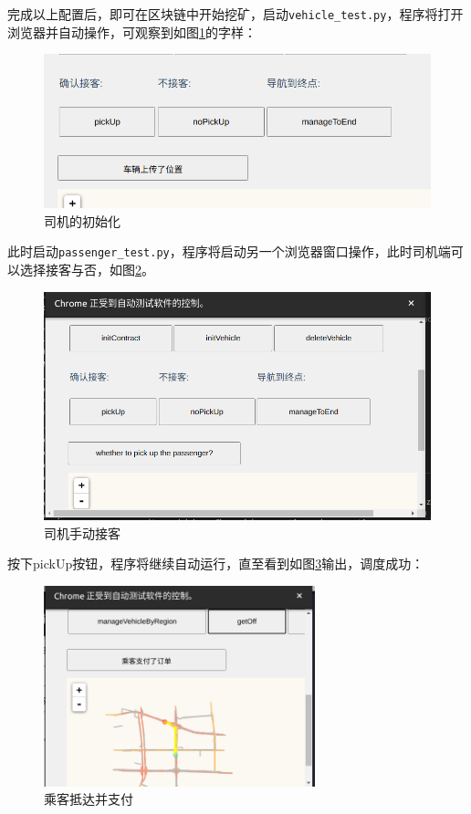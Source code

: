 完成以上配置后，即可在区块链中开始挖矿，启动\verb|vehicle_test.py|，程序将打开浏览器并自动操作，可观察到如图\ref{司机的初始化}的字样：

\begin{figure}[H]
    \centering
    \includegraphics[width=\textwidth]{images/vehicleInit.png}
    \caption{司机的初始化}\label{司机的初始化} %
\end{figure}

此时启动\verb|passenger_test.py|，程序将启动另一个浏览器窗口操作，此时司机端可以选择接客与否，如图\ref{司机手动接客}。

\begin{figure}[H]
    \centering
    \includegraphics[width=\textwidth]{images/pickUp.png}
    \caption{司机手动接客}\label{司机手动接客} %
\end{figure}

按下pickUp按钮，程序将继续自动运行，直至看到如图\ref{司机手动接乘客抵达并支付客}输出，调度成功：

\begin{figure}[H]
    \centering
    \includegraphics[width=0.7\textwidth]{images/passengerPay.png}
    \caption{乘客抵达并支付}\label{司机手动接乘客抵达并支付客} %
\end{figure}

